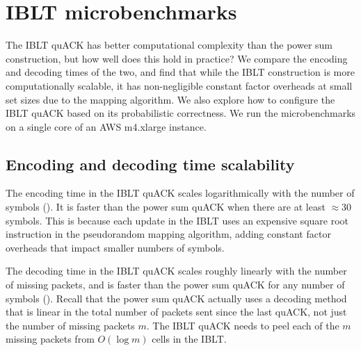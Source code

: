 \section{IBLT microbenchmarks}
\label{sec:quack:iblt-microbenchmarks}

The IBLT quACK has better computational complexity than the power sum
construction, but how well does this hold in practice? We compare the encoding
and decoding times of the two, and find that while the IBLT construction is
more computationally scalable, it has non-negligible constant factor overheads
at small set sizes due to the mapping algorithm. We also explore how to
configure the IBLT quACK based on its probabilistic correctness. We run the
microbenchmarks on a single core of an AWS m4.xlarge instance.

\subsection{Encoding and decoding time scalability}
\label{sec:quack:iblt-microbenchmarks:scalability}




The encoding time in the IBLT quACK scales logarithmically with the number of
symbols (). It is faster than the
power sum quACK when there are at least $\approx\!30$ symbols. This is because
each update in the IBLT uses an expensive square root instruction in the
pseudorandom mapping algorithm, adding constant factor overheads that impact
smaller numbers of symbols.

The decoding time in the IBLT quACK scales roughly linearly with the number
of missing packets, and is faster than the power sum quACK for any number of
symbols ().
Recall that the power sum quACK actually uses a decoding method that is linear
in the total number of packets sent since the last quACK, not just the number
of missing packets $m$. The IBLT quACK needs to peel each of the $m$ missing
packets from $O(\log m)$ cells in the IBLT.

